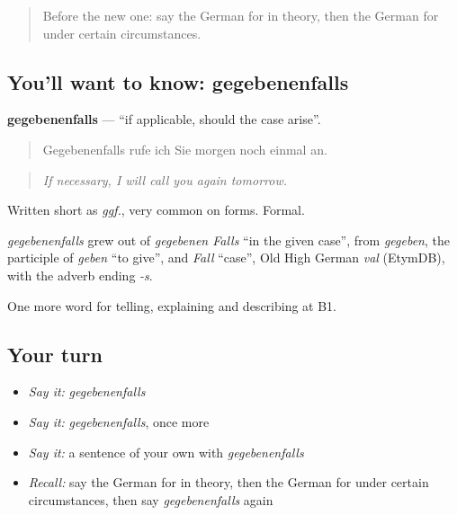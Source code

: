 \label{lesson:GE-C366-gegebenenfalls}



\begin{quote}
Before the new one: say the German for in theory, then the German for under certain circumstances.
\end{quote}

\subsection*{You'll want to know: gegebenenfalls}
\textbf{gegebenenfalls} — \textquotedblleft{}if applicable, should the case arise\textquotedblright{}.

\begin{quote}
Gegebenenfalls rufe ich Sie morgen noch einmal an.
\end{quote}

\begin{quote}
\emph{If necessary, I will call you again tomorrow.}
\end{quote}

Written short as \emph{ggf.}, very common on forms. Formal.

\begin{cousinweb}
\emph{gegebenenfalls} grew out of \emph{gegebenen Falls} \textquotedblleft{}in the given case\textquotedblright{}, from \emph{gegeben}, the participle of \emph{geben} \textquotedblleft{}to give\textquotedblright{}, and \emph{Fall} \textquotedblleft{}case\textquotedblright{}, Old High German \emph{val} (EtymDB), with the adverb ending \emph{-s}.
\end{cousinweb}

\begin{grammarlens}[title={What you've built}]
One more word for telling, explaining and describing at B1.
\end{grammarlens}

\subsection*{Your turn}
\begin{itemize}
\raggedright
  \item \emph{Say it:} \emph{gegebenenfalls}
  \item \emph{Say it:} \emph{gegebenenfalls}, once more
  \item \emph{Say it:} a sentence of your own with \emph{gegebenenfalls}
  \item \emph{Recall:} say the German for in theory, then the German for under certain circumstances, then say \emph{gegebenenfalls} again
\end{itemize}


